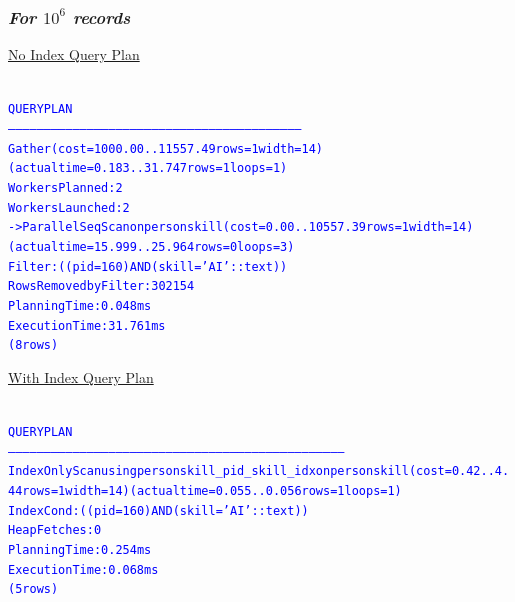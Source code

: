 \documentclass{article}
\begin{document}
    \subsubsection*{\emph{For $10^6$ records}}
    \underline{No Index Query Plan}
    \begin{center}
      {\tiny
      \begin{alltt}
      \textcolor{blue}{
        QUERY PLAN                                                         
        ---------------------------------------------------------------------------------------------------------------------------
         Gather  (cost=1000.00..11557.49 rows=1 width=14) (actual time=0.183..31.747 rows=1 loops=1)
           Workers Planned: 2
           Workers Launched: 2
           ->  Parallel Seq Scan on personskill  (cost=0.00..10557.39 rows=1 width=14) (actual time=15.999..25.964 rows=0 loops=3)
                 Filter: ((pid = 160) AND (skill = 'AI'::text))
                 Rows Removed by Filter: 302154
         Planning Time: 0.048 ms
         Execution Time: 31.761 ms
        (8 rows)
       }
      \end{alltt}
      }
    \end{center}
    \underline{With Index Query Plan}
    \begin{center}
      {\tiny
      \begin{alltt}
      \textcolor{blue}{
        QUERY PLAN                                                                  
        ---------------------------------------------------------------------------------------------------------------------------------------------
         Index Only Scan using personskill_pid_skill_idx on personskill  (cost=0.42..4.44 rows=1 width=14) (actual time=0.055..0.056 rows=1 loops=1)
           Index Cond: ((pid = 160) AND (skill = 'AI'::text))
           Heap Fetches: 0
         Planning Time: 0.254 ms
         Execution Time: 0.068 ms
        (5 rows)
       }
      \end{alltt}
      }
    \end{center}
\end{document}
